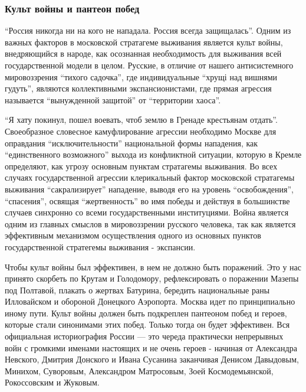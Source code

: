  
 
 
 
 

\subsubsection{Культ войны и пантеон побед}
\label{sec:16_01_2022.stz.news.ua.hvylya.1.anatomia_vraga.10.kult_vojny_i_panteon_pobed}

\enquote{Россия никогда ни на кого не нападала. Россия всегда защищалась}.
Одним из важных факторов в московской стратагеме выживания является культ
войны, внедряющийся в народе, как осознанная необходимость для выживания всей
государственной модели в целом. Русские, в отличие от нашего антисистемного
мировоззрения \enquote{тихого садочка}, где индивидуальные \enquote{хрущі над
вишнями гудуть}, являются коллективными экспансионистами, где прямая агрессия
называется \enquote{вынужденной защитой} от \enquote{территории хаоса}.

\enquote{Я хату покинул, пошел воевать, чтоб землю в Гренаде крестьянам
отдать}.  Своеобразное словесное камуфлирование агрессии необходимо Москве для
оправдания \enquote{исключительности} национальной формы нападения, как
\enquote{единственного возможного} выхода из конфликтной ситуации, которую в
Кремле определяют, как угрозу основным пунктам стратагемы выживания. Во всех
случаях государственной агрессии клерикальный фактор московской стратагемы
выживания \enquote{сакрализирует} нападение, выводя его на уровень
\enquote{освобождения}, \enquote{спасения}, освящая \enquote{жертвенность} во
имя победы и действуя в большинстве случаев синхронно со всеми государственными
институциями. Война является одним из главных смыслов в мировоззрении русского
человека, так как является эффективным механизмом осуществления одного из
основных пунктов государственной стратегемы выживания - экспансии.

Чтобы культ войны был эффективен, в нем не должно быть поражений. Это у нас
принято скорбеть по Крутам и Голодомору, рефлексировать о поражении Мазепы под
Полтавой, плакать о жертвах Батурина, бередить национальные раны Илловайском и
обороной Донецкого Аэропорта. Москва идет по принципиально иному пути. Культ
войны должен быть подкреплен пантеоном побед и героев, которые стали синонимами
этих побед. Только тогда он будет эффективен. Вся официальная историография
России — это череда практически непрерывных войн с громкими именами настоящих и
не очень героев - начиная от Александра Невского, Дмитрия Донского и Ивана
Сусанина заканчивая Денисом Давыдовым, Минихом, Суворовым, Александром
Матросовым, Зоей Космодемьянской, Рокоссовским и Жуковым.

